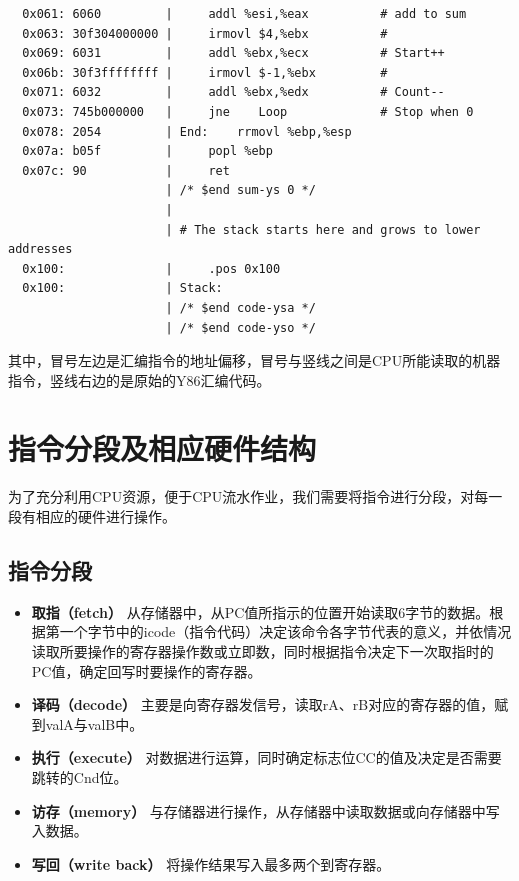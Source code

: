 \begin{verbatim}
  0x061: 6060         |     addl %esi,%eax          # add to sum
  0x063: 30f304000000 |     irmovl $4,%ebx          # 
  0x069: 6031         |     addl %ebx,%ecx          # Start++
  0x06b: 30f3ffffffff |     irmovl $-1,%ebx         # 
  0x071: 6032         |     addl %ebx,%edx          # Count--
  0x073: 745b000000   |     jne    Loop             # Stop when 0
  0x078: 2054         | End:    rrmovl %ebp,%esp
  0x07a: b05f         |     popl %ebp
  0x07c: 90           |     ret
                      | /* $end sum-ys 0 */
                      | 
                      | # The stack starts here and grows to lower addresses
  0x100:              |     .pos 0x100      
  0x100:              | Stack:   
                      | /* $end code-ysa */
                      | /* $end code-yso */
\end{verbatim}

其中，冒号左边是汇编指令的地址偏移，冒号与竖线之间是CPU所能读取的机器指令，竖线右边的是原始的Y86汇编代码。

\section{指令分段及相应硬件结构}\label{ux6307ux4ee4ux5206ux6bb5ux53caux76f8ux5e94ux786cux4ef6ux7ed3ux6784}

为了充分利用CPU资源，便于CPU流水作业，我们需要将指令进行分段，对每一段有相应的硬件进行操作。

\subsection{指令分段}\label{ux6307ux4ee4ux5206ux6bb5}

\begin{itemize}
\item
  \textbf{取指（fetch）}
  从存储器中，从PC值所指示的位置开始读取6字节的数据。根据第一个字节中的icode（指令代码）决定该命令各字节代表的意义，并依情况读取所要操作的寄存器操作数或立即数，同时根据指令决定下一次取指时的PC值，确定回写时要操作的寄存器。
\item
  \textbf{译码（decode）}
  主要是向寄存器发信号，读取rA、rB对应的寄存器的值，赋到valA与valB中。
\item
  \textbf{执行（execute）}
  对数据进行运算，同时确定标志位CC的值及决定是否需要跳转的Cnd位。
\item
  \textbf{访存（memory）}
  与存储器进行操作，从存储器中读取数据或向存储器中写入数据。
\item
  \textbf{写回（write back）} 将操作结果写入最多两个到寄存器。
\end{itemize}

